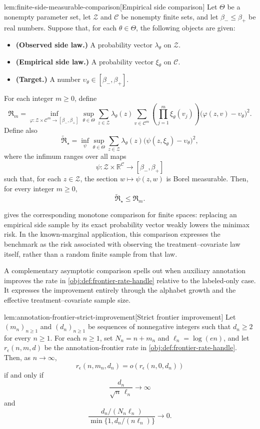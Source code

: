 \begin{lemmav}{lem:finite-side-measurable-comparison}[Empirical side comparison]
Let \(\Theta\) be a nonempty parameter set, let \(\mathcal Z\) and \(\mathcal C\) be nonempty finite sets, and let \(\beta_-\le \beta_+\) be real numbers. Suppose that, for each \(\theta\in\Theta\), the following objects are given:
\begin{itemize}
\item \textbf{(Observed side law.)} A probability vector \(\lambda_\theta\) on \(\mathcal Z\).
\item \textbf{(Empirical side law.)} A probability vector \(\xi_\theta\) on \(\mathcal C\).
\item \textbf{(Target.)} A number \(\upsilon_\theta\in[\beta_-,\beta_+]\).
\end{itemize}
For each integer \(m\ge0\), define
\[
\mathfrak R_m
=
\inf_{\varphi:\mathcal Z\times\mathcal C^m\to[\beta_-,\beta_+]}
\sup_{\theta\in\Theta}
\sum_{z\in\mathcal Z}\lambda_\theta(z)
\sum_{v\in\mathcal C^m}
\left(\prod_{j=1}^m \xi_\theta(v_j)\right)
\bigl(\varphi(z,v)-\upsilon_\theta\bigr)^2 .
\]
Define also
\[
\widetilde{\mathfrak R}_\star
=
\inf_{\psi}
\sup_{\theta\in\Theta}
\sum_{z\in\mathcal Z}\lambda_\theta(z)
\bigl(\psi(z,\xi_\theta)-\upsilon_\theta\bigr)^2 ,
\]
where the infimum ranges over all maps
\[
\psi:\mathcal Z\times\mathbb R^{\mathcal C}\to[\beta_-,\beta_+]
\]
such that, for each \(z\in\mathcal Z\), the section \(w\mapsto\psi(z,w)\) is Borel measurable. Then, for every integer \(m\ge0\),
\[
\widetilde{\mathfrak R}_\star\le \mathfrak R_m .
\]
\end{lemmav}

 gives the corresponding monotone comparison for finite spaces: replacing an empirical side sample by its exact probability vector weakly lowers the minimax risk. In the known-marginal application, this comparison expresses the benchmark as the risk associated with observing the treatment--covariate law itself, rather than a random finite sample from that law.

A complementary asymptotic comparison spells out when auxiliary annotation improves the rate in \cref{obj:def:frontier-rate-handle} relative to the labeled-only case. It expresses the improvement entirely through the alphabet growth and the effective treatment--covariate sample size.

\begin{lemmav}{lem:annotation-frontier-strict-improvement}[Strict frontier improvement]
Let \((m_n)_{n\ge 1}\) and \((d_n)_{n\ge 1}\) be sequences of nonnegative integers such that \(d_n\ge 2\) for every \(n\ge 1\). For each \(n\ge 1\), set \(N_n=n+m_n\) and \(\ell_n=\log(en)\), and let \(r_\epsilon(n,m,d)\) be the annotation-frontier rate in \cref{obj:def:frontier-rate-handle}. Then, as \(n\to\infty\),
\[
r_\epsilon(n,m_n,d_n)
=
o\!\left(r_\epsilon(n,0,d_n)\right)
\]
if and only if
\[
\frac{d_n}{\sqrt n\,\ell_n}\to\infty
\]
and
\[
\frac{d_n/(N_n\ell_n)}
{\min\{1,d_n/(n\ell_n)\}}
\to 0.
\]
\end{lemmav}

